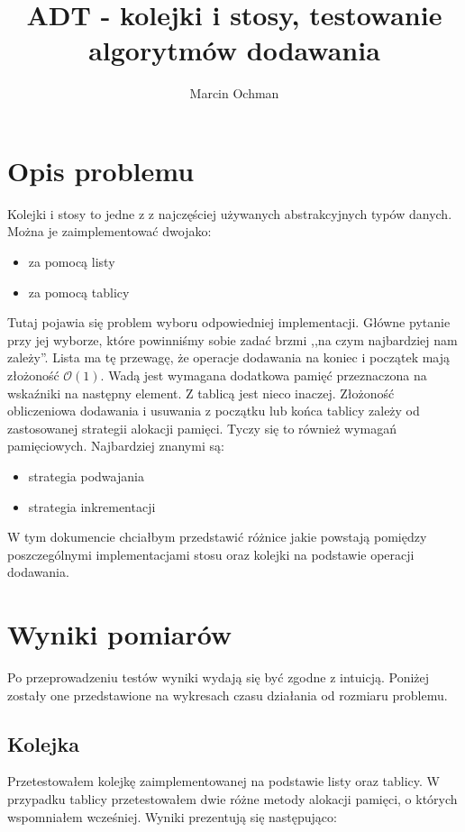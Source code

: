 \documentclass[10pt,a4paper]{article}
\author{Marcin Ochman}
\title{ADT - kolejki i stosy, testowanie algorytmów dodawania}
\begin{document}
\maketitle
\section{Opis problemu}
	
Kolejki i stosy to jedne z z najczęściej używanych abstrakcyjnych typów danych.
Można je zaimplementować dwojako:
\begin{itemize}
	\item za pomocą listy
	\item za pomocą tablicy
\end{itemize}

Tutaj pojawia się problem wyboru odpowiedniej implementacji. Główne pytanie przy jej wyborze, 
które powinniśmy sobie zadać brzmi ,,na czym najbardziej nam zależy''. Lista ma tę przewagę, że 
operacje dodawania na koniec i początek mają złożoność $\mathcal{O}(1)$. Wadą jest wymagana dodatkowa 
pamięć przeznaczona na wskaźniki na następny element. Z tablicą jest nieco inaczej. 
Złożoność obliczeniowa dodawania i usuwania z początku lub końca tablicy zależy od zastosowanej strategii 
alokacji pamięci. Tyczy się to również wymagań pamięciowych.
Najbardziej znanymi są:
\begin{itemize}
	\item strategia podwajania
	\item strategia inkrementacji
\end{itemize}
W tym dokumencie chciałbym przedstawić różnice jakie powstają pomiędzy poszczególnymi
implementacjami stosu oraz kolejki na podstawie operacji dodawania.

\section{Wyniki pomiarów}
Po przeprowadzeniu testów wyniki wydają się być zgodne z intuicją. Poniżej zostały one
przedstawione na wykresach czasu działania od rozmiaru problemu.

\subsection{Kolejka}

Przetestowałem kolejkę zaimplementowanej na podstawie listy oraz tablicy. W przypadku tablicy
przetestowałem dwie różne metody alokacji pamięci, o których wspomniałem wcześniej. Wyniki 
prezentują się następująco:
\end{document}
